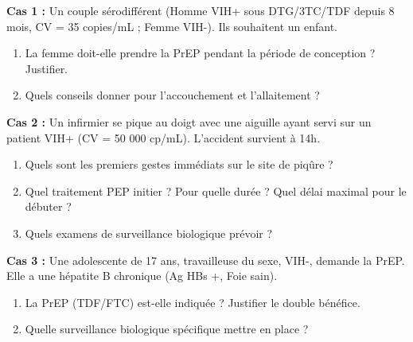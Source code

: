 \documentclass[11pt]{article}
\begin{document}
\begin{exercice}
\textbf{Cas 1 :} Un couple sérodifférent (Homme VIH+ sous DTG/3TC/TDF depuis 8 mois, CV = 35 copies/mL ; Femme VIH-). Ils souhaitent un enfant.
\begin{enumerate}
    \item La femme doit-elle prendre la PrEP pendant la période de conception ? Justifier.
    \item Quels conseils donner pour l'accouchement et l'allaitement ?
\end{enumerate}

\textbf{Cas 2 :} Un infirmier se pique au doigt avec une aiguille ayant servi sur un patient VIH+ (CV = 50 000 cp/mL). L'accident survient à 14h.
\begin{enumerate}
    \item Quels sont les premiers gestes immédiats sur le site de piqûre ?
    \item Quel traitement PEP initier ? Pour quelle durée ? Quel délai maximal pour le débuter ?
    \item Quels examens de surveillance biologique prévoir ?
\end{enumerate}

\textbf{Cas 3 :} Une adolescente de 17 ans, travailleuse du sexe, VIH-, demande la PrEP. Elle a une hépatite B chronique (Ag HBs +, Foie sain).
\begin{enumerate}
    \item La PrEP (TDF/FTC) est-elle indiquée ? Justifier le double bénéfice.
    \item Quelle surveillance biologique spécifique mettre en place ?
\end{enumerate}
\end{exercice}
\end{document}
